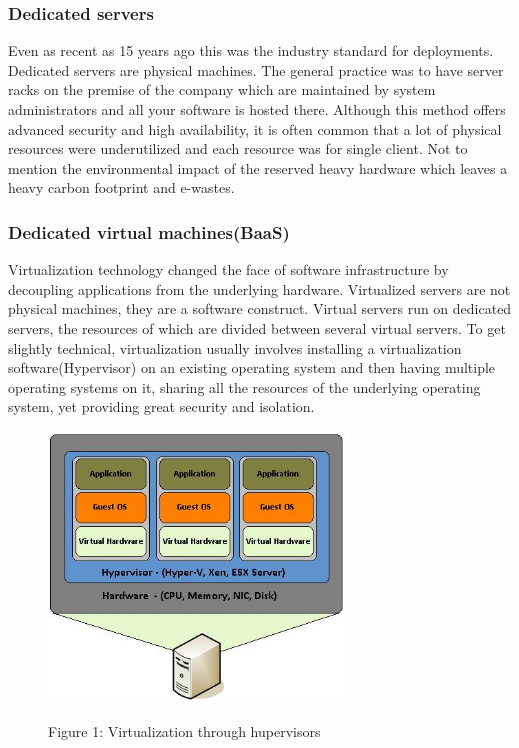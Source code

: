 \documentclass[12pt,titlepage]{article}
\begin{document}
\subsubsection{Dedicated servers}
\label{sec:org1bb81f7}
Even as recent as 15 years ago this was the industry standard for deployments. Dedicated servers
are physical machines. The general practice was to have server racks on the premise
of the company which are maintained by system administrators and all your
software is
hosted there. Although this method offers advanced security and high
availability, it is often common that a lot of physical resources were
underutilized and each resource was for single client. Not to mention the
environmental impact of the reserved heavy hardware which leaves a heavy carbon
footprint and e-wastes.


\subsubsection{Dedicated virtual machines(BaaS)}
\label{sec:org193c7e7}
Virtualization technology changed the face of software infrastructure by decoupling
applications from the underlying hardware. Virtualized servers are not physical
machines, they are a software construct. Virtual servers run on dedicated
servers, the resources of which are divided between several virtual servers.
To get slightly technical, virtualization usually involves installing a virtualization software(Hypervisor) on an
existing operating system and then having multiple operating systems on it,
sharing all the resources of the underlying operating system, yet providing
great security and isolation.

\begin{figure}[!h]
    \caption{Figure 1: Virtualization through hupervisors}
    \centering
    \includegraphics[width=80mm]{./thesis_images/virtual_machines.JPG}
    \label{fig:testing the label}
\end{figure}
\end{document}
